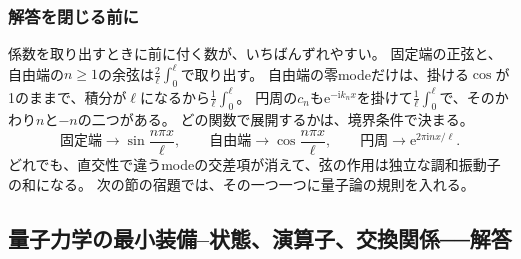 \documentclass[paper=b5j,fontsize=11Q,jafontsize=11Q,baselineskip=19Q]{jlreq}
\newcommand{\runningtitle}{章題未定}
\newcommand{\e}{\mathrm{e}}
\newcommand{\imunit}{\mathrm{i}}
\numberwithin{equation}{section}
\begin{document}
\subsubsection*{解答を閉じる前に}

係数を取り出すときに前に付く数が、いちばんずれやすい。
固定端の正弦と、自由端の$n\geq1$の余弦は$\frac2\ell\int_0^\ell$で取り出す。
自由端の零modeだけは、掛ける$\cos$が1のままで、積分が$\ell$になるから$\frac1\ell\int_0^\ell$。
円周の$c_n$も$\e^{-\imunit k_nx}$を掛けて$\frac1\ell\int_0^\ell$で、そのかわり$n$と$-n$の二つがある。
どの関数で展開するかは、境界条件で決まる。
\[
  \text{固定端}\longrightarrow\sin\frac{n\pi x}{\ell},
  \qquad
  \text{自由端}\longrightarrow\cos\frac{n\pi x}{\ell},
  \qquad
  \text{円周}\longrightarrow\e^{2\pi\imunit nx/\ell}.
\]
どれでも、直交性で違うmodeの交差項が消えて、弦の作用は独立な調和振動子の和になる。
次の節の宿題では、その一つ一つに量子論の規則を入れる。


\par\bigskip
\endgroup
\begingroup
\renewcommand{\runningtitle}{解答 第3章　波動・量子力学・場}
\newcommand{\comm}[2]{\left[#1,#2\right]}
\newcommand{\avg}[1]{\left\langle #1\right\rangle}
\renewcommand{\runningtitle}{解答 第3章　波動・量子力学・場}
\subsection[量子力学の最小装備]{量子力学の最小装備--状態、演算子、交換関係──解答}
\end{document}

